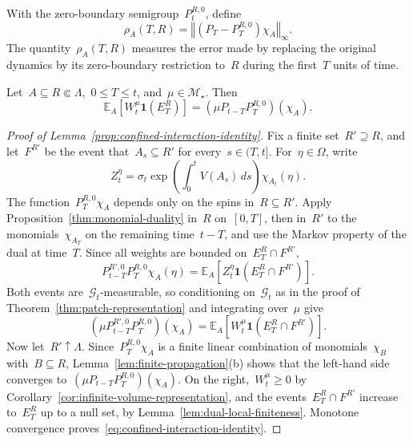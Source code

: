 \documentclass[EJP,preprint,NODS,nobera]{ejpecp}
\newcommand{\E}{\mathbb{E}}
\newcommand{\bb}[1]{\left(#1\right)}
\newcommand{\Cb}[1]{\left[#1\right]}
\newcommand{\norm}[1]{\left\Vert#1\right\Vert}
\newcommand{\ind}{\mathbf{1}}
\begin{document}
With the zero-boundary
semigroup~$P_t^{R,0}$, define
\begin{equation}
\label{eq:confinement-error}
\rho_A(T,R)
=
\norm{\bb{P_T-P_T^{R,0}}\chi_A}_\infty.
\end{equation}
The quantity~$\rho_A(T,R)$ measures the error made by replacing the original
dynamics by its zero-boundary restriction to~$R$ during the first~$T$ units of
time.

\begin{lemma}
\label{prop:confined-interaction-identity}
Let~$A\subseteq R\Subset\Lambda$,~$0\leq T\leq t$, and~$\mu\in\mathcal M_\star$. Then
\begin{equation}
\label{eq:confined-interaction-identity}
\E_A\Cb{W_t^\mu\ind\bb{E_T^R}}
=
(\mu P_{t-T}P_T^{R,0})(\chi_A).
\end{equation}
\end{lemma}

\begin{proof}[Proof of Lemma~\ref{prop:confined-interaction-identity}]
Fix a finite set~$R'\supseteq R$, and let~$F^{R'}$ be the event that~$A_s\subseteq R'$
for every~$s\in(T,t]$. For~$\eta\in\Omega$, write
\begin{equation*}
Z_t^\eta
=
\sigma_t
\exp\bb{\int_0^tV(A_s)\,ds}
\chi_{A_t}(\eta).
\end{equation*}
The function~$P_T^{R,0}\chi_A$ depends only on the spins in~$R\subseteq R'$.
Apply Proposition~\ref{thm:monomial-duality} in~$R$ on~$[0,T]$, then in~$R'$
to the monomials~$\chi_{A_T}$ on the remaining time~$t-T$, and use the Markov
property of the dual at time~$T$. Since all weights are bounded on~$E_T^R\cap F^{R'}$,
\begin{equation*}
P_{t-T}^{R',0}P_T^{R,0}\chi_A(\eta)
=
\E_A\Cb{Z_t^\eta\ind\bb{E_T^R\cap F^{R'}}}.
\end{equation*}
Both events are~$\mathcal G_t$-measurable, so conditioning on~$\mathcal G_t$ as in
the proof of Theorem~\ref{thm:patch-representation} and integrating over~$\mu$ give
\begin{equation*}
(\mu P_{t-T}^{R',0}P_T^{R,0})(\chi_A)
=
\E_A\Cb{W_t^\mu\ind\bb{E_T^R\cap F^{R'}}}.
\end{equation*}
Now let~$R'\uparrow\Lambda$. Since~$P_T^{R,0}\chi_A$ is a finite linear combination of
monomials~$\chi_B$ with~$B\subseteq R$, Lemma~\ref{lem:finite-propagation}(b)
shows that the left-hand side converges to~$(\mu P_{t-T}P_T^{R,0})(\chi_A)$. On
the right,~$W_t^\mu\geq0$ by Corollary~\ref{cor:infinite-volume-representation},
and the events~$E_T^R\cap F^{R'}$ increase to~$E_T^R$ up to a null set, by
Lemma~\ref{lem:dual-local-finiteness}. Monotone convergence proves~\eqref{eq:confined-interaction-identity}.
\end{proof}
\end{document}
